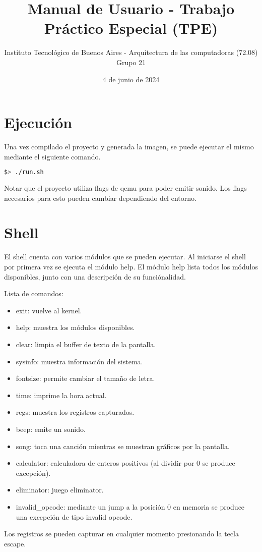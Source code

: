 \documentclass{article}
\title{\textbf{Manual de Usuario - Trabajo Práctico Especial (TPE)}}
\author{ \large Instituto Tecnológico de Buenos Aires - Arquitectura de las computadoras (72.08) \\ [1ex]
\large Grupo 21}
\date{4 de junio de 2024}
\begin{document}
\maketitle

\section *{Ejecución}

Una vez compilado el proyecto y generada la imagen, se puede ejecutar el mismo mediante el siguiente comando.

\begin{lstlisting}[language=bash]
$> ./run.sh
\end{lstlisting}

Notar que el proyecto utiliza flags de qemu para poder emitir sonido. Los flags necesarios para esto pueden cambiar dependiendo del entorno.

\section *{Shell}

El shell cuenta con varios módulos que se pueden ejecutar. Al iniciarse el shell por primera vez se ejecuta el módulo help. El módulo help lista todos los módulos disponibles, junto con una descripción de su funciónalidad.

Lista de comandos:
\begin{itemize}
\item exit: vuelve al kernel.
\item help: muestra los módulos disponibles.
\item clear: limpia el buffer de texto de la pantalla.
\item sysinfo: muestra información del sistema.
\item fontsize: permite cambiar el tamaño de letra.
\item time: imprime la hora actual.
\item regs: muestra los registros capturados.
\item beep: emite un sonido.
\item song: toca una canción mientras se muestran gráficos por la pantalla.
\item calculator: calculadora de enteros positivos (al dividir por 0 se produce excepción).
\item eliminator: juego eliminator.
\item invalid\_opcode: mediante un jump a la posición 0 en memoria se produce una excepción de tipo invalid opcode.
\end{itemize}
Los registros se pueden capturar en cualquier momento presionando la tecla escape.
\end{document}
